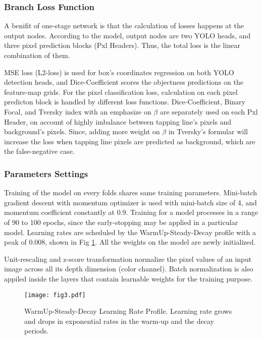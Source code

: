 \documentclass[default,pdflatex,iicol]{sn-jnl}%
\begin{document}
\subsubsection{Branch Loss Function}\label{subsubsec-pxlbranch}
A benifit of one-stage network is that the calculation of losses happens at the output nodes. According to the model, output nodes are two YOLO heads, and three pixel prediction blocks (Pxl Headers). Thus, the total loss is the linear combination of them.

MSE loss (L2-loss) is used for box's coordinates regression on both YOLO detection heads, and Dice-Coefficient scores the objectness predictions on the feature-map grids. For the pixel classification loss, calculation on each pixel predicton block is handled by different loss functions. Dice-Coefficient, Binary Focal, and Tversky index with an emphasize on $\beta$ are separately used on each Pxl Header, on account of highly imbalance between tapping line's pixels and background's pixels. Since, adding more weight on $\beta$ in Tversky's formular \cite{tverskyloss} will increase the loss when tapping line pixels are predicted as background, which are the false-negative case.

\subsubsection{Parameters Settings}\label{subsubsec-trainingparams}
Training of the model on every folds shares same training parameters. Mini-batch gradient descent with momentum optimizer is used with mini-batch size of 4, and momentum coefficient constantly at 0.9. Training for a model processes in a range of 90 to 100 epochs, since the early-stopping may be applied in a particular model. Learning rates are scheduled by the WarmUp-Steady-Decay profile with a peak of 0.008, shown in Fig \ref{fig3-LR}. All the weights on the model are newly initialized. 

Unit-rescaling and z-score transformation normalize the pixel values of an input image across all its depth dimension (color channel). Batch normalization is also appiled inside the layers that contain learnable weights for the training purpose.

\begin{figure}[h]%
\centering
\texttt{[image: fig3.pdf]}
\caption{WarmUp-Steady-Decay Learning Rate Profile. Learning rate grows and drops in exponential rates in the warm-up and the decay periods.}\label{fig3-LR}
\end{figure}
\end{document}
